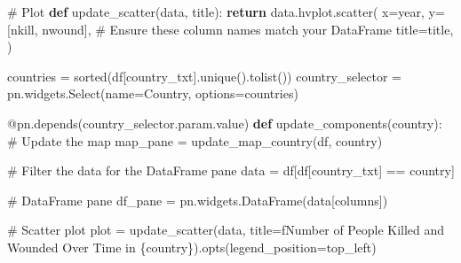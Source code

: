 \documentclass[
  letterpaper,
  DIV=11,
  numbers=noendperiod]{scrreprt}
\newenvironment{Shaded}{\begin{snugshade}}{\end{snugshade}}
\newcommand{\AttributeTok}[1]{\textcolor[rgb]{0.40,0.45,0.13}{#1}}
\newcommand{\BuiltInTok}[1]{\textcolor[rgb]{0.00,0.23,0.31}{#1}}
\newcommand{\CommentTok}[1]{\textcolor[rgb]{0.37,0.37,0.37}{#1}}
\newcommand{\ControlFlowTok}[1]{\textcolor[rgb]{0.00,0.23,0.31}{\textbf{#1}}}
\newcommand{\KeywordTok}[1]{\textcolor[rgb]{0.00,0.23,0.31}{\textbf{#1}}}
\newcommand{\NormalTok}[1]{\textcolor[rgb]{0.00,0.23,0.31}{#1}}
\newcommand{\OperatorTok}[1]{\textcolor[rgb]{0.37,0.37,0.37}{#1}}
\newcommand{\SpecialCharTok}[1]{\textcolor[rgb]{0.37,0.37,0.37}{#1}}
\newcommand{\SpecialStringTok}[1]{\textcolor[rgb]{0.13,0.47,0.30}{#1}}
\newcommand{\StringTok}[1]{\textcolor[rgb]{0.13,0.47,0.30}{#1}}
\begin{document}
\begin{Shaded}
\begin{Highlighting}[]
\CommentTok{\# Plot}
\KeywordTok{def}\NormalTok{ update\_scatter(data, title):}
        \ControlFlowTok{return}\NormalTok{ data.hvplot.scatter(}
\NormalTok{        x}\OperatorTok{=}\StringTok{\textquotesingle{}year\textquotesingle{}}\NormalTok{, }
\NormalTok{        y}\OperatorTok{=}\NormalTok{[}\StringTok{\textquotesingle{}nkill\textquotesingle{}}\NormalTok{, }\StringTok{\textquotesingle{}nwound\textquotesingle{}}\NormalTok{],  }\CommentTok{\# Ensure these column names match your DataFrame}
\NormalTok{        title}\OperatorTok{=}\NormalTok{title,}
\NormalTok{    )}
\end{Highlighting}
\end{Shaded}

\begin{Shaded}
\begin{Highlighting}[]
\NormalTok{countries }\OperatorTok{=} \BuiltInTok{sorted}\NormalTok{(df[}\StringTok{\textquotesingle{}country\_txt\textquotesingle{}}\NormalTok{].unique().tolist())}
\NormalTok{country\_selector }\OperatorTok{=}\NormalTok{ pn.widgets.Select(name}\OperatorTok{=}\StringTok{\textquotesingle{}Country\textquotesingle{}}\NormalTok{, options}\OperatorTok{=}\NormalTok{countries)}

\AttributeTok{@pn.depends}\NormalTok{(country\_selector.param.value)}
\KeywordTok{def}\NormalTok{ update\_components(country):}
    \CommentTok{\# Update the map}
\NormalTok{    map\_pane }\OperatorTok{=}\NormalTok{ update\_map\_country(df, country)}
    
    \CommentTok{\# Filter the data for the DataFrame pane}
\NormalTok{    data }\OperatorTok{=}\NormalTok{ df[df[}\StringTok{\textquotesingle{}country\_txt\textquotesingle{}}\NormalTok{] }\OperatorTok{==}\NormalTok{ country]}
    
    \CommentTok{\# DataFrame pane}
\NormalTok{    df\_pane }\OperatorTok{=}\NormalTok{ pn.widgets.DataFrame(data[columns])}
    
    \CommentTok{\# Scatter plot}
\NormalTok{    plot }\OperatorTok{=}\NormalTok{ update\_scatter(data, title}\OperatorTok{=}\SpecialStringTok{f\textquotesingle{}Number of People Killed and Wounded Over Time in }\SpecialCharTok{\{}\NormalTok{country}\SpecialCharTok{\}}\SpecialStringTok{\textquotesingle{}}\NormalTok{).opts(legend\_position}\OperatorTok{=}\StringTok{\textquotesingle{}top\_left\textquotesingle{}}\NormalTok{)}
    

\end{Highlighting}
\end{Shaded}
\end{document}
